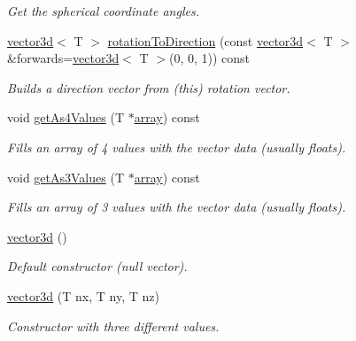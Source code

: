 \begin{DoxyCompactItemize}
\begin{DoxyCompactList}\small\item\em Get the spherical coordinate angles. \end{DoxyCompactList}\item 
\hyperlink{classirr_1_1core_1_1vector3d}{vector3d}$<$ T $>$ \hyperlink{classirr_1_1core_1_1vector3d_a53d222e7aace72513210bddb2b25376f}{rotation\+To\+Direction} (const \hyperlink{classirr_1_1core_1_1vector3d}{vector3d}$<$ T $>$ \&forwards=\hyperlink{classirr_1_1core_1_1vector3d}{vector3d}$<$ T $>$(0, 0, 1)) const
\begin{DoxyCompactList}\small\item\em Builds a direction vector from (this) rotation vector. \end{DoxyCompactList}\item 
void \hyperlink{classirr_1_1core_1_1vector3d_aa661941fdf725c83dc560b15232fdf6e}{get\+As4\+Values} (T $\ast$\hyperlink{classirr_1_1core_1_1array}{array}) const
\begin{DoxyCompactList}\small\item\em Fills an array of 4 values with the vector data (usually floats). \end{DoxyCompactList}\item 
void \hyperlink{classirr_1_1core_1_1vector3d_af9e676bc10fe34e49e544373a33d7d21}{get\+As3\+Values} (T $\ast$\hyperlink{classirr_1_1core_1_1array}{array}) const
\begin{DoxyCompactList}\small\item\em Fills an array of 3 values with the vector data (usually floats). \end{DoxyCompactList}\item 
\mbox{\label{classirr_1_1core_1_1vector3d_aed8875ec8b9653857ea87fdb8213daf1}} 
\hyperlink{classirr_1_1core_1_1vector3d_aed8875ec8b9653857ea87fdb8213daf1}{vector3d} ()
\begin{DoxyCompactList}\small\item\em Default constructor (null vector). \end{DoxyCompactList}\item 
\mbox{\label{classirr_1_1core_1_1vector3d_a10687f6e33f8f795961a9b8f0a71c79b}} 
\hyperlink{classirr_1_1core_1_1vector3d_a10687f6e33f8f795961a9b8f0a71c79b}{vector3d} (T nx, T ny, T nz)
\begin{DoxyCompactList}\small\item\em Constructor with three different values. \end{DoxyCompactList}\item 

\end{DoxyCompactItemize}
